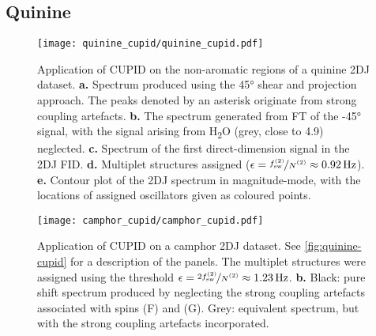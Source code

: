 \subsection{Quinine}
\begin{figure}
    \centering
    \texttt{[image: quinine\_cupid/quinine\_cupid.pdf]}
    \caption[
        Application of \acs{CUPID} on the non-aromatic regions of a quinine
        \acs{2DJ} dataset.
    ]{
        Application of \ac{CUPID} on the non-aromatic regions of a quinine
        \ac{2DJ} dataset.
        \textbf{a.} Spectrum produced using the \ang{45} shear and projection
        approach. The peaks denoted by an asterisk originate from strong
        coupling artefacts.
        \textbf{b.} The spectrum generated from \ac{FT} of the \ang{-45}
        signal, with the signal arising from H\textsubscript{2}O (grey, close
        to \qty{4.9}{\partspermillion}) neglected.
        \textbf{c.} Spectrum of the first direct-dimension signal in the
        \ac{2DJ} \ac{FID}.
        \textbf{d.} Multiplet structures assigned ($\epsilon =
        \nicefrac{\fswtwo}{\Ntwo} \approx \qty{0.92}{\hertz}$).
        \textbf{e.} Contour plot of the \ac{2DJ} spectrum in magnitude-mode,
        with the locations of assigned oscillators given as coloured points.
    }
    \label{fig:quinine-cupid}
    \vspace{20pt}
    \texttt{[image: camphor\_cupid/camphor\_cupid.pdf]}%
    \caption[
        Application of \acs{CUPID} on a camphor dataset.
    ]{
        Application of \acs{CUPID} on a camphor \ac{2DJ} dataset.
        See \cref{fig:quinine-cupid} for a description of the panels.
        The multiplet structures were assigned using the threshold
        $\epsilon = \nicefrac{2 \fswtwo}{\Ntwo} \approx \qty{1.23}{\hertz}$.
        \textbf{b.} Black: pure shift spectrum produced by neglecting the
        strong coupling artefacts associated with spins (F) and (G).
        Grey: equivalent spectrum, but with the strong coupling artefacts
        incorporated.
    }
    \label{fig:camphor-cupid}%
\end{figure}

